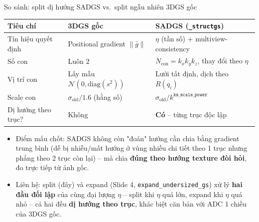 \begin{frame}{So sánh: split dị hướng SADGS vs.\ split ngẫu nhiên 3DGS gốc}
\footnotesize
\centering
\begin{tabular}{lll}
\toprule
\textbf{Tiêu chí} & \textbf{3DGS gốc} & \textbf{SADGS (\texttt{\_structgs})} \\
\midrule
Tín hiệu quyết định & Positional gradient $\|\bar g\|$ & $\eta$ (tần số) $+$ multiview-consistency \\
Số con & Luôn $2$ & $N_{\text{con}}=k_x k_y k_z$, thay đổi theo $\eta$ \\
Vị trí con & Lấy mẫu $\mathcal N(0,\mathrm{diag}(s^2))$ & Lưới tất định, dịch theo $R(q_i)$ \\
Scale con & $\sigma_{\text{old}}/1.6$ (hằng số) & $\sigma_{\text{old}}/k^{\texttt{ks\_scale\_power}}$ \\
Dị hướng theo trục? & Không & \textbf{Có} -- từng trục độc lập \\
\bottomrule
\end{tabular}
\vspace{0.3cm}
\begin{itemize}
    \item Điểm mấu chốt: SADGS không còn "đoán" hướng cần chia bằng gradient trung bình (dễ bị nhiễu/mất hướng ở vùng nhiều chi tiết theo 1 trục nhưng phẳng theo 2 trục còn lại) -- mà chia \textbf{đúng theo hướng texture đòi hỏi}, đo trực tiếp từ ảnh gốc.
    \item Liên hệ: split (đây) và expand (Slide 4, \texttt{expand\_undersized\_gs}) xử lý \textbf{hai đầu đối lập} của cùng đại lượng $\eta$ -- split khi $\eta$ quá lớn, expand khi $\eta$ quá nhỏ -- cả hai đều \textbf{dị hướng theo trục}, khác biệt căn bản với ADC 1 chiều của 3DGS gốc.
\end{itemize}
\end{frame}
